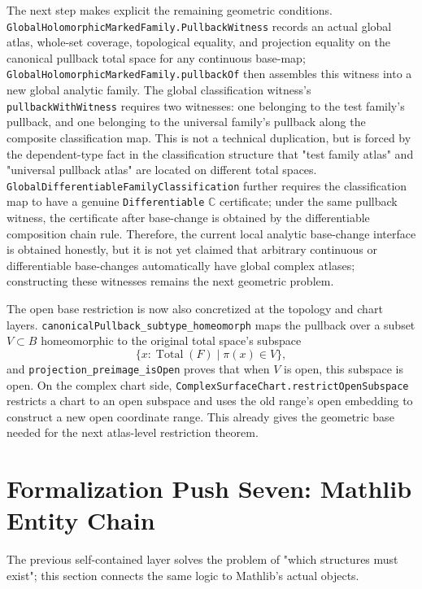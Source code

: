 \documentclass[UTF8,a4paper,11pt]{article}
\begin{document}
\par
The next step makes explicit the remaining geometric conditions.
\texttt{GlobalHolomorphic\allowbreak Marked\allowbreak Family\allowbreak.Pullback\allowbreak Witness} records an actual global atlas, whole-set coverage, topological equality, and projection equality on the canonical pullback total space for any continuous base-map;
\texttt{GlobalHolomorphic\allowbreak Marked\allowbreak Family\allowbreak.pullbackOf} then assembles this witness into a new global analytic family.
The global classification witness's \texttt{pullbackWithWitness} requires two witnesses: one belonging to the test family's pullback, and one belonging to the universal family's pullback along the composite classification map.
This is not a technical duplication, but is forced by the dependent-type fact in the classification structure that "test family atlas" and "universal pullback atlas" are located on different total spaces.
\texttt{GlobalDifferentiable\allowbreak Family\allowbreak Classification} further requires the classification map to have a genuine
\texttt{Differentiable\allowbreak} \(\mathbb C\) certificate; under the same pullback witness, the certificate after base-change is obtained by the differentiable composition chain rule.
Therefore, the current local analytic base-change interface is obtained honestly, but it is not yet claimed that arbitrary continuous or differentiable base-changes automatically have global complex atlases; constructing these witnesses remains the next geometric problem.
\par
The open base restriction is now also concretized at the topology and chart layers. \texttt{canonicalPullback\_subtype\_homeomorph} maps
the pullback over a subset \(V\subset B\) homeomorphic to the original total space's subspace
\[
  \{x:\operatorname{Total}(F)\mid \pi(x)\in V\},
\]
and \texttt{projection\_preimage\_isOpen} proves that when \(V\) is open, this subspace is open.
On the complex chart side, \texttt{ComplexSurfaceChart\allowbreak.restrictOpenSubspace} restricts a chart to an open subspace and uses the old range's open embedding to construct a new open coordinate range. This already gives the geometric base needed for the next atlas-level restriction theorem.

\section{Formalization Push Seven: Mathlib Entity Chain}

The previous self-contained layer solves the problem of "which structures must exist"; this section connects the same logic to Mathlib's actual objects.
\end{document}
